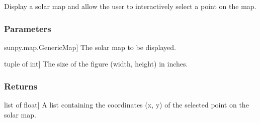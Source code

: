 \documentclass[letterpaper,10pt,english]{sphinxmanual}
\begin{document}
\begin{fulllineitems}
\label{\detokenize{pycatch/utils/plot:pycatch.utils.plot.get_point_from_map}}
\pysigstartsignatures
{}
\pysigstopsignatures
\sphinxAtStartPar
Display a solar map and allow the user to interactively select a point on the map.


\subsubsection{Parameters}
\label{\detokenize{pycatch/utils/plot:id1}}\begin{description}
\sphinxlineitem{map}{[}sunpy.map.GenericMap{]}
\sphinxAtStartPar
The solar map to be displayed.

\sphinxlineitem{fsize}{[}tuple of int{]}
\sphinxAtStartPar
The size of the figure (width, height) in inches.

\end{description}


\subsubsection{Returns}
\label{\detokenize{pycatch/utils/plot:returns}}\begin{description}
\sphinxlineitem{point}{[}list of float{]}
\sphinxAtStartPar
A list containing the coordinates (x, y) of the selected point on the solar map.

\end{description}

\end{fulllineitems}

\end{document}
